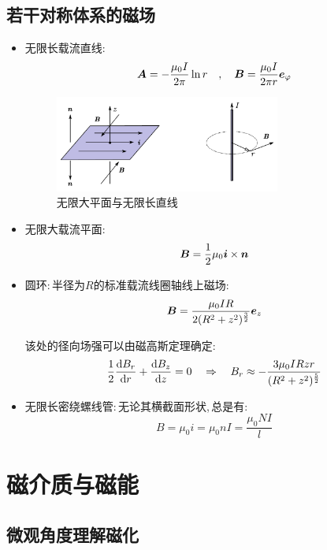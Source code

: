 \subsection{若干对称体系的磁场}

\begin{itemize}
\item 无限长载流直线:
\[\boldsymbol{A}=-\frac{\mu_0 I}{2\pi}\ln r\quad ,\quad \boldsymbol{B}=\frac{\mu_0 I}{2\pi r}\boldsymbol{e}_\varphi\]

\begin{figure}[H]
\centering
\includegraphics[width=0.7\textwidth]{image/7-4-1.png}
\caption{无限大平面与无限长直线}\label{fig7-4-1}
\end{figure}

\item 无限大载流平面:
\[\boldsymbol{B}=\frac{1}{2}\mu_0\boldsymbol{i}\times \boldsymbol{n}\]

\item 圆环:\,半径为$R$的标准载流线圈轴线上磁场:
\[\boldsymbol{B}=\frac{\mu_0IR}{2(R^2+z^2)^{\frac{3}{2}}}\boldsymbol{e}_z\]

该处的径向场强可以由磁高斯定理确定:
\[\frac{1}{2}\frac{\textrm{d} B_r}{\textrm{d} r}+\frac{\textrm{d} B_z}{\textrm{d} z}=0\quad \Rightarrow \quad B_r\approx -\frac{3\mu_0IRzr}{(R^2+z^2)^{\frac{5}{2}}}\]

\item 无限长密绕螺线管:\,无论其横截面形状,\,总是有:
\[B=\mu_0 i=\mu_0 nI=\frac{\mu_0 NI}{l}\]
\end{itemize}


\npg{-2cm}

\section{磁介质与磁能}

\subsection{微观角度理解磁化}

